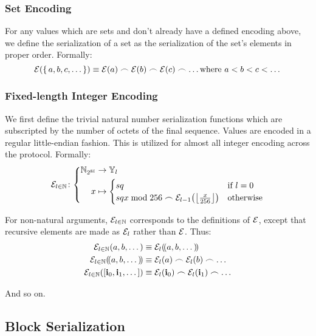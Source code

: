 \subsubsection{Set Encoding}
For any values which are sets and don't already have a defined encoding above, we define the serialization of a set as the serialization of the set's elements in proper order. Formally:
\begin{equation}
  \encode{\set{a, b, c, \dots}} \equiv \encode{a} \concat \encode{b} \concat \encode{c} \concat \dots \where a < b < c < \dots
\end{equation}

\subsubsection{Fixed-length Integer Encoding}
We first define the trivial natural number serialization functions which are subscripted by the number of octets of the final sequence. Values are encoded in a regular little-endian fashion. This is utilized for almost all integer encoding across the protocol. Formally:
\begin{equation}
  \se_{l \in \N}\colon\abracegroup{
    \Nbits{8l} &\to \bloboflen{l} \\
    x &\mapsto \begin{cases}
      sq{} &\when l = 0 \\
      sq{x \bmod 256} \concat \se_{l - 1}\left(\floor{\frac{x}{256}}\right) &\otherwise
    \end{cases}
  }
\end{equation}

For non-natural arguments, $\mathcal{E}_{l \in \mathbb{N}}$ corresponds to the definitions of $\mathcal{E}$, except that recursive elements are made as $\mathcal{E}_{l}$ rather than $\mathcal{E}$. Thus:
\begin{align}
  \fixedencode{l \in \N}{a, b, \dots} &\equiv \fixedencode{l}{\tup{a, b, \dots}}\\
  \fixedencode{l \in \N}{\tup{a, b, \dots}} &\equiv \fixedencode{l}{a} \concat \fixedencode{l}{b} \concat \dots\\
  \fixedencode{l \in \N}{\sq{\mathbf{i}_0, \mathbf{i}_1, \dots}} &\equiv \fixedencode{l}{\mathbf{i}_0} \concat \fixedencode{l}{\mathbf{i}_1} \concat \dots
\end{align}

And so on.

\subsection{Block Serialization}

